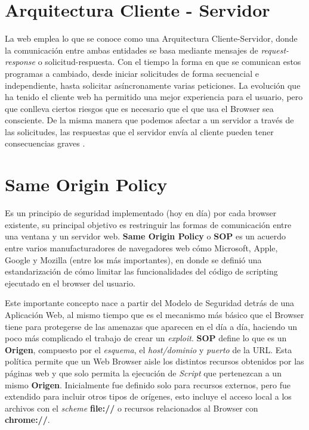 \section{Arquitectura Cliente - Servidor}
La web emplea lo que se conoce como una Arquitectura Cliente-Servidor, donde la comunicación entre ambas entidades se basa mediante mensajes de \textit{request-response} o solicitud-respuesta. Con el tiempo la forma en que se comunican estos programas a cambiado, desde iniciar solicitudes de forma secuencial e independiente, hasta solicitar asíncronamente varias peticiones. La evolución que ha tenido el cliente web ha permitido una mejor experiencia para el usuario, pero que conlleva ciertos riesgos que es necesario que el que usa el Browser sea consciente. De la misma manera que podemos afectar a un servidor a través de las solicitudes, las respuestas que el servidor envía al cliente pueden tener consecuencias graves \cite{alcorn2014browser}.



\section{Same Origin Policy} %
\label{chap:SOP}

Es un principio de seguridad implementado (hoy en día) por cada browser existente, su principal objetivo es restringuir las formas de comunicación entre una ventana y un servidor web. \textbf{Same Origin Policy} o \textbf{SOP} es un acuerdo entre varios manufacturadores de navegadores web cómo Microsoft, Apple, Google y Mozilla (entre los más importantes), en donde se definió una estandarización de cómo limitar las funcionalidades del código de scripting ejecutado en el browser del usuario. 

Este importante concepto nace a partir del Modelo de Seguridad detrás de una Aplicación Web, al mismo tiempo que es el mecanismo más básico que el Browser tiene para protegerse de las amenazas que aparecen en el día a día, haciendo un poco más complicado el trabajo de crear un \textit{exploit}. \textbf{SOP} define lo que es un \textbf{Origen}, compuesto por el \textit{esquema}, el \textit{host/dominio} y \textit{puerto} de la URL. Esta política permite que un Web Browser aisle los distintos recursos obtenidos por las páginas web y que solo permita la ejecución de \textit{Script} que pertenezcan a un mismo \textbf{Origen}. Inicialmente fue definido solo para recursos externos, pero fue extendido para incluir otros tipos de orígenes, esto incluye el acceso local a los archivos con el \textit{scheme} \textbf{file://} o recursos relacionados al Browser con \textbf{chrome://}.

